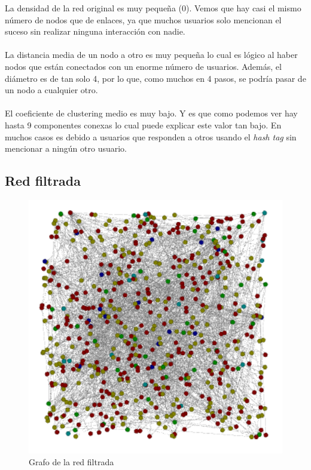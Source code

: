 La densidad de la red original es muy pequeña (0). Vemos que hay casi el mismo número de nodos que de enlaces, ya que muchos usuarios solo mencionan el suceso sin realizar ninguna interacción con nadie.
\\ \\
La distancia media de un nodo a otro es muy pequeña lo cual es lógico al haber nodos que están conectados con un enorme número de usuarios. Además, el diámetro es de tan solo 4, por lo que, como muchos en 4 pasos, se podría pasar de un nodo a cualquier otro.
\\ \\
El coeficiente de clustering medio es muy bajo. Y es que como podemos ver hay hasta 9 componentes conexas lo cual puede explicar este valor tan bajo. En muchos casos es debido a usuarios que responden a otros usando el \textit{hash tag} sin mencionar a ningún otro usuario.

\subsection{Red filtrada}

\begin{figure}[H]
	\centering
	\includegraphics[width=12cm]{../images/filtered-graph}
	\caption{Grafo de la red filtrada}
\end{figure}

